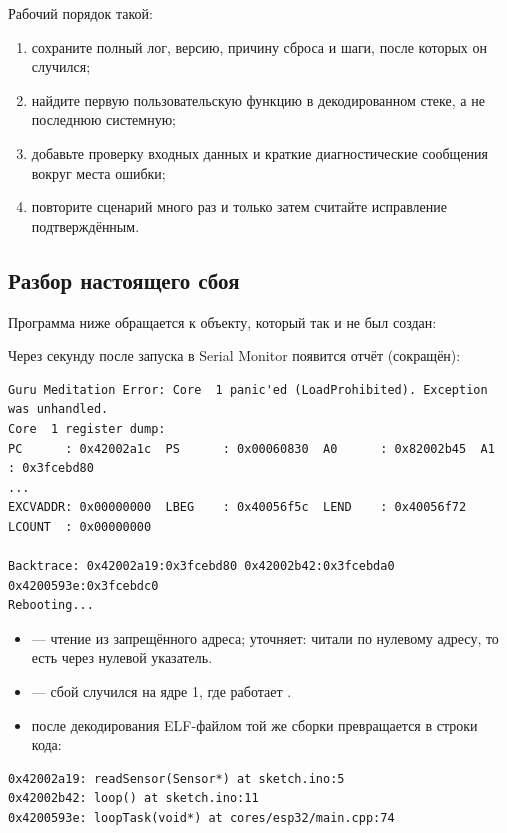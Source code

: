 Рабочий порядок такой:
\begin{enumerate}
  \item сохраните полный лог, версию, причину сброса и шаги, после которых он случился;
  \item найдите первую пользовательскую функцию в декодированном стеке, а не последнюю системную;
  \item добавьте проверку входных данных и краткие диагностические сообщения вокруг места ошибки;
  \item повторите сценарий много раз и только затем считайте исправление подтверждённым.
\end{enumerate}

\subsection{Разбор настоящего сбоя}

Программа ниже обращается к объекту, который так и не был создан:


Через секунду после запуска в Serial Monitor появится отчёт (сокращён):

\begin{Verbatim}[fontsize=\scriptsize,bgcolor=codebg]
Guru Meditation Error: Core  1 panic'ed (LoadProhibited). Exception was unhandled.
Core  1 register dump:
PC      : 0x42002a1c  PS      : 0x00060830  A0      : 0x82002b45  A1      : 0x3fcebd80
...
EXCVADDR: 0x00000000  LBEG    : 0x40056f5c  LEND    : 0x40056f72  LCOUNT  : 0x00000000

Backtrace: 0x42002a19:0x3fcebd80 0x42002b42:0x3fcebda0 0x4200593e:0x3fcebdc0
Rebooting...
\end{Verbatim}

\begin{itemize}
  \item {} --- чтение из запрещённого адреса;  уточняет:
        читали по нулевому адресу, то есть через нулевой указатель.
  \item {} --- сбой случился на ядре 1, где работает .
  \item {} после декодирования ELF-файлом той же сборки превращается в строки кода:
\end{itemize}

\begin{Verbatim}[fontsize=\scriptsize,bgcolor=codebg]
0x42002a19: readSensor(Sensor*) at sketch.ino:5
0x42002b42: loop() at sketch.ino:11
0x4200593e: loopTask(void*) at cores/esp32/main.cpp:74
\end{Verbatim}

